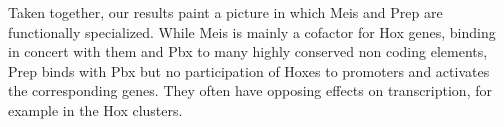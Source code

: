 Taken together, our results paint a picture in which Meis and Prep are functionally specialized. While Meis is mainly a cofactor for Hox genes, binding in concert with them and Pbx to many highly conserved non coding elements, Prep binds with Pbx but no participation of Hoxes to promoters and activates the corresponding genes. They often have opposing effects on transcription, for example in the Hox clusters. 




